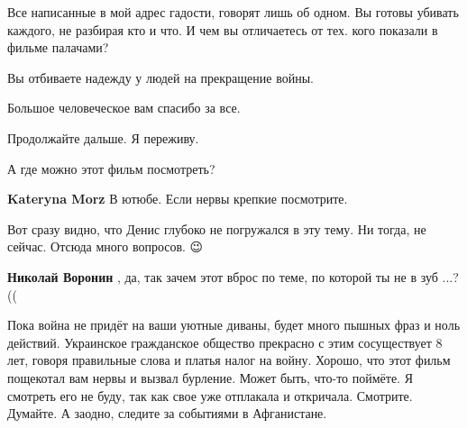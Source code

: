 \begin{itemize}
\begin{itemize}
Все написанные в мой адрес гадости, говорят лишь об одном. Вы готовы убивать
каждого, не разбирая кто и что. И чем вы отличаетесь от тех. кого показали в
фильме палачами?

Вы отбиваете надежду у людей на прекращение войны.

Большое человеческое вам спасибо за все.

Продолжайте дальше. Я переживу.

\end{itemize}

 
А где можно этот фильм посмотреть?


\begin{itemize}

 
\textbf{Kateryna Morz} В ютюбе. Если нервы крепкие посмотрите.
\end{itemize}

\par
 
Вот сразу видно, что Денис глубоко не погружался в эту тему. Ни тогда, не сейчас. Отсюда много вопросов. 😉

\begin{itemize}
 
\textbf{Николай Воронин} , да, так зачем этот вброс по теме, по которой ты не в зуб ...?((
\end{itemize}

 
Пока война не придёт на ваши уютные диваны, будет много пышных фраз и ноль
действий. Украинское гражданское общество прекрасно с этим сосуществует 8 лет,
говоря правильные слова и платья налог на войну. Хорошо, что этот фильм
пощекотал вам нервы и вызвал бурление. Может быть, что-то поймёте. Я смотреть
его не буду, так как свое уже отплакала и откричала. Смотрите. Думайте. А
заодно, следите за событиями в Афганистане.

\end{itemize}

